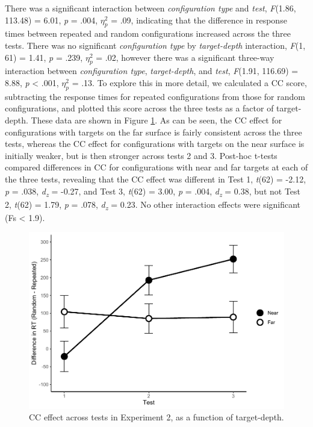 \documentclass[
  english,
  man,floatsintext]{apa7}
\begin{document}
There was a significant interaction between \emph{configuration type} and \emph{test}, \emph{F}(1.86, 113.48) = 6.01, \emph{p} = .004, \(\eta^2_p\) = .09, indicating that the difference in response times between repeated and random configurations increased across the three tests. There was no significant \emph{configuration type} by \emph{target-depth} interaction, \emph{F}(1, 61) = 1.41, \emph{p} = .239, \(\eta^2_p\) = .02, however there was a significant three-way interaction between \emph{configuration type}, \emph{target-depth}, and \emph{test}, \emph{F}(1.91, 116.69) = 8.88, \emph{p} \textless{} .001, \(\eta^2_p\) = .13. To explore this in more detail, we calculated a CC score, subtracting the response times for repeated configurations from those for random configurations, and plotted this score across the three tests as a factor of target-depth. These data are shown in Figure \ref{fig:Exp2-CC-figure}. As can be seen, the CC effect for configurations with targets on the far surface is fairly consistent across the three tests, whereas the CC effect for configurations with targets on the near surface is initially weaker, but is then stronger across tests 2 and 3. Post-hoc t-tests compared differences in CC for configurations with near and far targets at each of the three tests, revealing that the CC effect was different in Test 1, \emph{t}(62) = -2.12, \emph{p} = .038, \emph{d\textsubscript{z}} = -0.27, and Test 3, \emph{t}(62) = 3.00, \emph{p} = .004, \emph{d\textsubscript{z}} = 0.38, but not Test 2, \emph{t}(62) = 1.79, \emph{p} = .078, \emph{d\textsubscript{z}} = 0.23. No other interaction effects were significant (Fs \textless{} 1.9).



\begin{figure}

{\centering \includegraphics[width=1\linewidth]{CCVR_manuscript_files/figure-latex/Exp2-CC-figure-1} 

}

\caption{CC effect across tests in Experiment 2, as a function of target-depth.}\label{fig:Exp2-CC-figure}
\end{figure}
\end{document}
